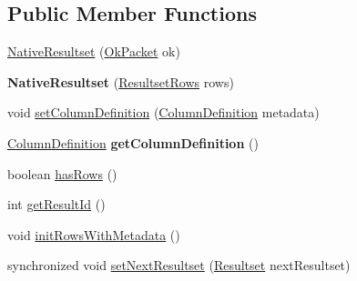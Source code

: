 \subsection*{Public Member Functions}
\begin{DoxyCompactItemize}
\item 
\mbox{\hyperlink{classcom_1_1mysql_1_1cj_1_1protocol_1_1a_1_1result_1_1_native_resultset_a3d5e1cead6b9cf22857d61765721592b}{Native\+Resultset}} (\mbox{\hyperlink{classcom_1_1mysql_1_1cj_1_1protocol_1_1a_1_1result_1_1_ok_packet}{Ok\+Packet}} ok)
\item 
\mbox{\label{classcom_1_1mysql_1_1cj_1_1protocol_1_1a_1_1result_1_1_native_resultset_a2365bcabea095ddb95d038c4f57535a2}} 
{\bfseries Native\+Resultset} (\mbox{\hyperlink{interfacecom_1_1mysql_1_1cj_1_1protocol_1_1_resultset_rows}{Resultset\+Rows}} rows)
\item 
void \mbox{\hyperlink{classcom_1_1mysql_1_1cj_1_1protocol_1_1a_1_1result_1_1_native_resultset_a103a093ccb3cf34125ff020ddc9ad6d8}{set\+Column\+Definition}} (\mbox{\hyperlink{interfacecom_1_1mysql_1_1cj_1_1protocol_1_1_column_definition}{Column\+Definition}} metadata)
\item 
\mbox{\label{classcom_1_1mysql_1_1cj_1_1protocol_1_1a_1_1result_1_1_native_resultset_a46cbcef39f6907dc5aa12d6f1353cf32}} 
\mbox{\hyperlink{interfacecom_1_1mysql_1_1cj_1_1protocol_1_1_column_definition}{Column\+Definition}} {\bfseries get\+Column\+Definition} ()
\item 
boolean \mbox{\hyperlink{classcom_1_1mysql_1_1cj_1_1protocol_1_1a_1_1result_1_1_native_resultset_a6873a98d8b78925b9260230838d280d2}{has\+Rows}} ()
\item 
int \mbox{\hyperlink{classcom_1_1mysql_1_1cj_1_1protocol_1_1a_1_1result_1_1_native_resultset_ad10ec652380313c1eb2cb1dd67c4ea7e}{get\+Result\+Id}} ()
\item 
void \mbox{\hyperlink{classcom_1_1mysql_1_1cj_1_1protocol_1_1a_1_1result_1_1_native_resultset_a55681e1e25bdf8a26e098f812979bec3}{init\+Rows\+With\+Metadata}} ()
\item 
synchronized void \mbox{\hyperlink{classcom_1_1mysql_1_1cj_1_1protocol_1_1a_1_1result_1_1_native_resultset_a69d6943f5f8f3e38a159e89897c583b2}{set\+Next\+Resultset}} (\mbox{\hyperlink{interfacecom_1_1mysql_1_1cj_1_1protocol_1_1_resultset}{Resultset}} next\+Resultset)

\end{DoxyCompactItemize}
